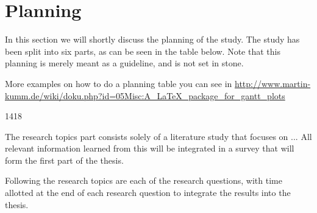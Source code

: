 \section{Planning}


In this section we will shortly discuss the planning of the study. The study has been split into six parts, as can be seen in the table below. Note that this planning is merely meant as a guideline, and is not set in stone.

More examples on how to do a planning table you can see in \url{http://www.martin-kumm.de/wiki/doku.php?id=05Misc:A_LaTeX_package_for_gantt_plots}

\begin{figure*}[t!]
	\centering
	\begin{gantt}[xunitlength=0.5cm,fontsize=\small,titlefontsize=\small,drawledgerline=true]{14}{18} %
		
		\begin{ganttitle} %
		\end{ganttitle}
		
		\begin{ganttitle} %
		\end{ganttitle}
		
		\begin{ganttitle} %
		\end{ganttitle}
		
		
		
		
		
	\end{gantt}	
\end{figure*}


The research topics part consists solely of a literature study that focuses on ... All relevant information learned from this will be integrated in a survey that will form the first part of the thesis.

Following the research topics are each of the research questions, with time allotted at the end of each research question to integrate the results into the thesis. 